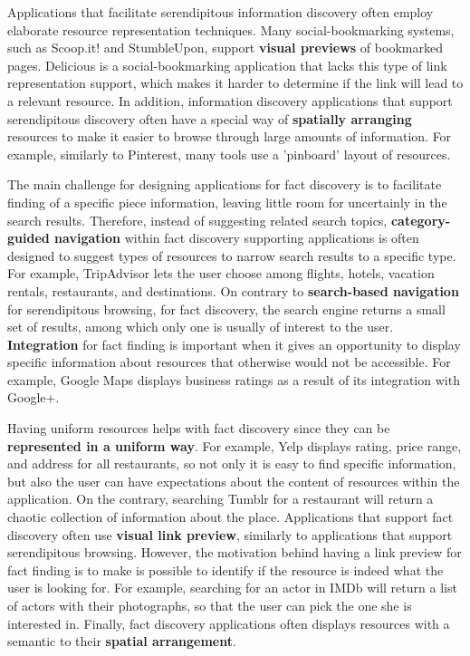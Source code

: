 \documentclass{casconpaper}
\begin{document}
{Applications that facilitate serendipitous information discovery often employ elaborate resource representation techniques. Many social-bookmarking systems, such as Scoop.it! and StumbleUpon, support \textbf{visual previews} of bookmarked pages. Delicious is a social-bookmarking application that lacks this type of link representation support, which makes it harder to determine if the link will lead to a relevant resource. In addition, information discovery applications that support serendipitous discovery often have a special way of \textbf{spatially arranging} resources to make it easier to browse through large amounts of information. For example, similarly to Pinterest, many tools use a 'pinboard' layout of resources.

The main challenge for designing applications for fact discovery is to facilitate finding of a specific piece information, leaving little room for uncertainly in the search results. Therefore, instead of suggesting related search topics, \textbf{category-guided navigation} within fact discovery supporting applications is often designed to suggest types of resources to narrow search results to a specific type. For example, TripAdvisor lets the user choose among flights, hotels, vacation rentals, restaurants, and destinations. On contrary to \textbf{search-based navigation} for serendipitous browsing, for fact discovery, the search engine returns a small set of results, among which only one is usually of interest to the user. \textbf{Integration} for fact finding is important when it gives an opportunity to display specific information about resources that otherwise would not be accessible. For example, Google Maps displays business ratings as a result of its integration with Google+.  

Having uniform resources helps with fact discovery since they can be \textbf{represented in a uniform way}. For example, Yelp displays rating, price range, and address for all restaurants, so not only it is easy to find specific information, but also the user can have expectations about the content of resources within the application. On the contrary, searching Tumblr for a restaurant will return a chaotic collection of information about the place.  Applications that support fact discovery often use \textbf{visual link preview}, similarly to applications that support serendipitous browsing. However, the motivation behind having a link preview for fact finding is to make is possible to identify if the resource is indeed what the user is looking for. For example, searching for an actor in IMDb will return a list of actors with their photographs, so that the user can pick the one she is interested in. Finally, fact discovery applications often displays resources with a semantic to their \textbf{spatial arrangement}. 

}
\end{document}
